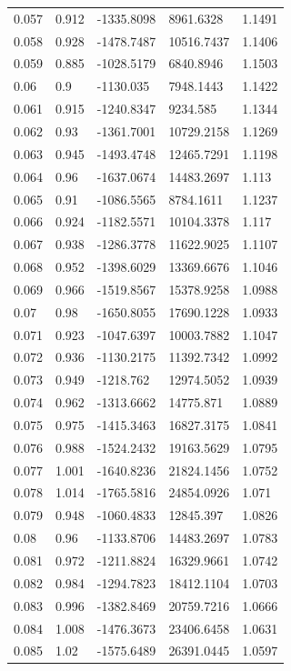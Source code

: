 \begin{tabular}{lllll}
0.057 & 0.912 & -1335.8098 & 8961.6328 & 1.1491 \\
0.058 & 0.928 & -1478.7487 & 10516.7437 & 1.1406 \\
0.059 & 0.885 & -1028.5179 & 6840.8946 & 1.1503 \\
0.06 & 0.9 & -1130.035 & 7948.1443 & 1.1422 \\
0.061 & 0.915 & -1240.8347 & 9234.585 & 1.1344 \\
0.062 & 0.93 & -1361.7001 & 10729.2158 & 1.1269 \\
0.063 & 0.945 & -1493.4748 & 12465.7291 & 1.1198 \\
0.064 & 0.96 & -1637.0674 & 14483.2697 & 1.113 \\
0.065 & 0.91 & -1086.5565 & 8784.1611 & 1.1237 \\
0.066 & 0.924 & -1182.5571 & 10104.3378 & 1.117 \\
0.067 & 0.938 & -1286.3778 & 11622.9025 & 1.1107 \\
0.068 & 0.952 & -1398.6029 & 13369.6676 & 1.1046 \\
0.069 & 0.966 & -1519.8567 & 15378.9258 & 1.0988 \\
0.07 & 0.98 & -1650.8055 & 17690.1228 & 1.0933 \\
0.071 & 0.923 & -1047.6397 & 10003.7882 & 1.1047 \\
0.072 & 0.936 & -1130.2175 & 11392.7342 & 1.0992 \\
0.073 & 0.949 & -1218.762 & 12974.5052 & 1.0939 \\
0.074 & 0.962 & -1313.6662 & 14775.871 & 1.0889 \\
0.075 & 0.975 & -1415.3463 & 16827.3175 & 1.0841 \\
0.076 & 0.988 & -1524.2432 & 19163.5629 & 1.0795 \\
0.077 & 1.001 & -1640.8236 & 21824.1456 & 1.0752 \\
0.078 & 1.014 & -1765.5816 & 24854.0926 & 1.071 \\
0.079 & 0.948 & -1060.4833 & 12845.397 & 1.0826 \\
0.08 & 0.96 & -1133.8706 & 14483.2697 & 1.0783 \\
0.081 & 0.972 & -1211.8824 & 16329.9661 & 1.0742 \\
0.082 & 0.984 & -1294.7823 & 18412.1104 & 1.0703 \\
0.083 & 0.996 & -1382.8469 & 20759.7216 & 1.0666 \\
0.084 & 1.008 & -1476.3673 & 23406.6458 & 1.0631 \\
0.085 & 1.02 & -1575.6489 & 26391.0445 & 1.0597 \\

\end{tabular}
